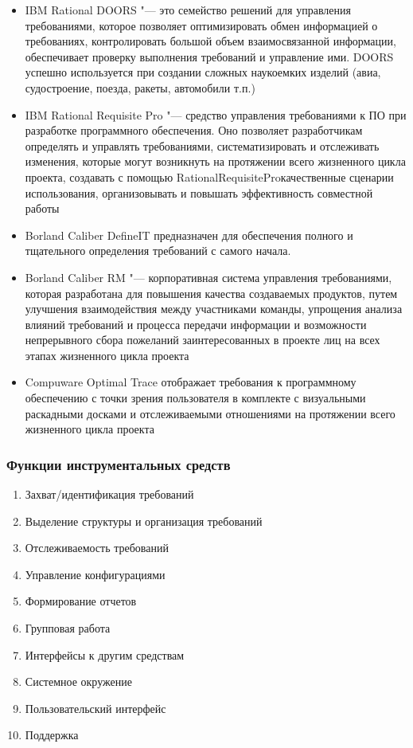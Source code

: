 \documentclass{../industrial-development}
\begin{document}
	\begin{itemize}
\item IBM Rational DOORS "--- это семейство решений для управления требованиями, которое позволяет оптимизировать обмен информацией о требованиях, контролировать большой объем взаимосвязанной информации, обеспечивает проверку выполнения требований и управление ими. DOORS успешно используется при создании сложных наукоемких изделий (авиа, судостроение, поезда, ракеты, автомобили т.п.)
\item IBM Rational Requisite Pro "--- средство управления требованиями к ПО при разработке программного обеспечения. Оно позволяет разработчикам определять и управлять требованиями, систематизировать и отслеживать изменения, которые могут возникнуть на протяжении всего жизненного цикла проекта, создавать с помощью RationalRequisiteProкачественные сценарии использования, организовывать и повышать эффективность совместной работы
\item Borland Caliber DefineIT предназначен для обеспечения полного и тщательного определения требований с самого начала.
\item Borland Caliber RM "--- корпоративная система управления требованиями, которая разработана для повышения качества создаваемых продуктов, путем улучшения взаимодействия между участниками команды, упрощения анализа влияний требований и процесса передачи информации и возможности непрерывного сбора пожеланий заинтересованных в проекте лиц на всех этапах жизненного цикла проекта
\item Compuware Optimal Trace отображает требования к программному обеспечению с точки зрения пользователя в комплекте с визуальными раскадными досками и отслеживаемыми отношениями на протяжении всего жизненного цикла проекта
  	\end{itemize}




\begin{frame} \frametitle{Функции инструментальных средств}
	\begin{enumerate}
\item Захват/идентификация требований
\item Выделение структуры и организация требований
\item Отслеживаемость требований
\item Управление конфигурациями
\item Формирование отчетов
\item Групповая работа
\item Интерфейсы к другим средствам
\item Системное окружение
\item Пользовательский интерфейс
\item Поддержка
  	\end{enumerate}
\end{frame}
\end{document}
